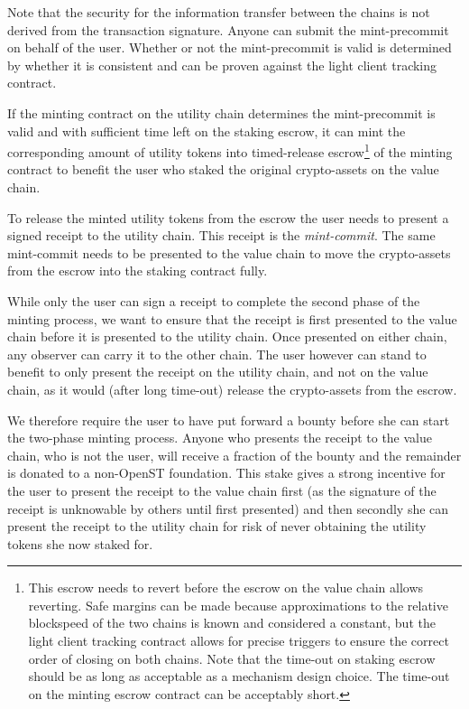 \documentclass[12pt,a4paper, twocolumn]{article}
\begin{document}
Note that the security for the information transfer between the chains is not derived from the transaction signature.  Anyone can submit the mint-precommit on behalf of the user.  Whether or not the mint-precommit is valid is determined by whether it is consistent and can be proven against the light client tracking contract.\par
If the minting contract on the utility chain determines the mint-precommit is valid and with sufficient time left on the staking escrow, it can mint the corresponding amount of utility tokens into timed-release escrow\footnote{This escrow needs to revert before the escrow on the value chain allows reverting. Safe margins can be made because approximations to the relative blockspeed of the two chains is known and considered a constant, but the light client tracking contract allows for precise triggers to ensure the correct order of closing on both chains.  Note that the time-out on staking escrow should be as long as acceptable as a mechanism design choice.  The time-out on the minting escrow contract can be acceptably short.} of the minting contract to benefit the user who staked the original crypto-assets on the value chain.\par
To release the minted utility tokens from the escrow the user needs to present a signed receipt to the utility chain. This receipt is the \textit{mint-commit}.  The same mint-commit needs to be presented to the value chain to move the crypto-assets from the escrow into the staking contract fully.\par
While only the user can sign a receipt to complete the second phase of the minting process, we want to ensure that the receipt is first presented to the value chain before it is presented to the utility chain.  Once presented on either chain, any observer can carry it to the other chain.  The user however can stand to benefit to only present the receipt on the utility chain, and not on the value chain, as it would (after long time-out) release the crypto-assets from the escrow. \par
We therefore require the user to have put forward a bounty before she can start the two-phase minting process.  Anyone who presents the receipt to the value chain, who is not the user, will receive a fraction of the bounty and the remainder is donated to a non-OpenST foundation.  This stake gives a strong incentive for the user to present the receipt to the value chain first (as the signature of the receipt is unknowable by others until first presented) and then secondly she can present the receipt to the utility chain for risk of never obtaining the utility tokens she now staked for. \par
\end{document}
